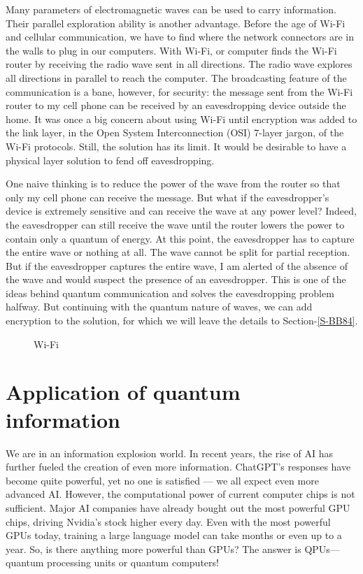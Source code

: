 \documentclass[oneside, letter, 12pt]{book}
\begin{document}
Many parameters of electromagnetic waves can be used to carry information. Their parallel exploration ability is another advantage. Before the age of Wi-Fi and cellular communication, we have to find where the network connectors are in the walls to plug in our computers. With Wi-Fi, or computer finds the Wi-Fi router by receiving the radio wave sent in all directions. The radio wave explores all directions in parallel to reach the computer. The broadcasting feature of the communication is a bane, however, for security: the message sent from the Wi-Fi router to my cell phone can be received by an eavesdropping device outside the home. It was once a big concern about using Wi-Fi until encryption was added to the link layer, in the Open System Interconnection (OSI) 7-layer jargon, of the Wi-Fi protocols. Still, the solution has its limit. It would be desirable to have a physical layer solution to fend off eavesdropping.

One naive thinking is to reduce the power of the wave from the router so that only my cell phone can receive the message. But what if the eavesdropper's device is extremely sensitive and can receive the wave at any power level? Indeed, the eavesdropper can still receive the wave until the router lowers the power to contain only a quantum of energy. At this point, the eavesdropper has to capture the entire wave or nothing at all. The wave cannot be split for partial reception. But if the eavesdropper captures the entire wave, I am alerted of the absence of the wave and would suspect the presence of an eavesdropper. This is one of the ideas behind quantum communication and solves the eavesdropping problem halfway. But continuing with the quantum nature of waves, we can add encryption to the solution, for which we will leave the details to Section-\ref{S-BB84}.

\begin{figure}[h]\label{Room-WiFi}
\caption{Wi-Fi}
\end{figure}


\section{Application of quantum information}
We are in an information explosion world. In recent years, the rise of AI has further fueled the creation of even more information. ChatGPT’s responses have become quite powerful, yet no one is satisfied — we all expect even more advanced AI. However, the computational power of current computer chips is not sufficient. Major AI companies have already bought out the most powerful GPU chips, driving Nvidia’s stock higher every day. Even with the most powerful GPUs today, training a large language model can take months or even up to a year. So, is there anything more powerful than GPUs? The answer is QPUs—quantum processing units or quantum computers!
\end{document}
